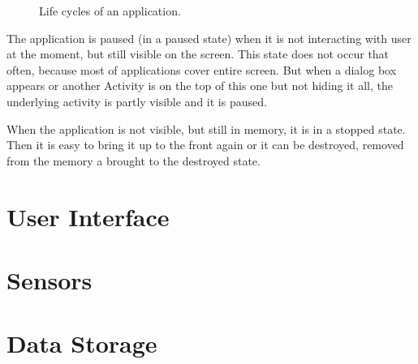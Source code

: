 \begin{figure}[h!]
    \caption{Life cycles of an application.}
\end{figure}

The application is paused (in a paused state) when it is not interacting with user at the moment, but still visible on the screen.
This state does not occur that often, because most of applications cover entire screen.
But when a dialog box appears or another Activity is on the top of this one but not hiding it all, the underlying activity is partly visible and it is paused.

When the application is not visible, but still in memory, it is in a stopped state.
Then it is easy to bring it up to the front again or it can be destroyed, removed from the memory a brought to the destroyed state.

\section{User Interface}

\section{Sensors}

\section{Data Storage}



